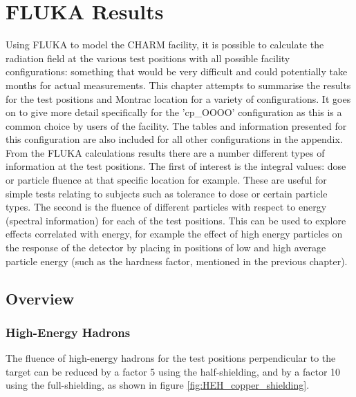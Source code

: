 %

\newpage
\section{FLUKA Results}

Using FLUKA to model the CHARM facility, it is possible to calculate the radiation field at the various test positions with all possible facility configurations: something that would be very difficult and could potentially take months for actual measurements. This chapter attempts to summarise the results for the test positions and Montrac location for a variety of configurations. It goes on to give more detail specifically for the 'cp\_OOOO' configuration as this is a common choice by users of the facility. The tables and information  presented for this configuration are also included for all other configurations in the appendix. \\

From the FLUKA calculations results there are a number different types of information at the test positions. The first of interest is the integral values: dose or particle fluence at that specific location for example. These are useful for simple tests relating to subjects such as tolerance to dose or certain particle types. The second is the fluence of different particles with respect to energy (spectral information) for each of the test positions. This can be used to explore effects correlated with energy, for example the effect of high energy particles on the response of the detector by placing in positions of low and high average particle energy (such as the hardness factor, mentioned in the previous chapter). \\

\subsection{Overview}

\subsubsection*{High-Energy Hadrons}

The fluence of high-energy hadrons for the test positions perpendicular to the target can be reduced by a factor 5 using the half-shielding, and by a factor 10 using the full-shielding, as shown in figure \ref{fig:HEH_copper_shielding}. \\

